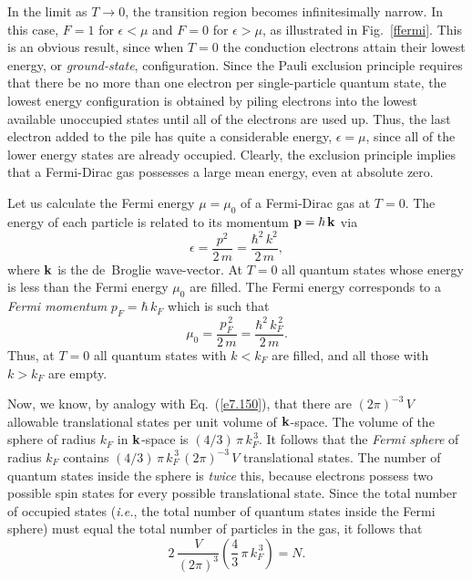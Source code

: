 In the limit as $T\rightarrow 0$, the transition region becomes
infinitesimally narrow. In this case, $F=1$ for $\epsilon<\mu$ and
$F=0$ for $\epsilon>\mu$, as illustrated in Fig.~\ref{ffermi}.
This is an obvious result, since when $T=0$ the conduction
electrons attain their lowest energy, or  {\em ground-state}, configuration.
Since the Pauli exclusion principle requires that there be no
more than one electron per single-particle quantum state, the lowest
energy configuration is obtained by piling
electrons into the lowest available unoccupied states until all of
the electrons are used up. Thus, the last electron added to the
pile has quite a considerable energy, $\epsilon= \mu$, since all of the
lower energy states are already occupied. Clearly, the exclusion principle
implies that a Fermi-Dirac gas possesses a large mean energy, even at absolute
zero.

Let us calculate the Fermi energy $\mu=\mu_0$ of a Fermi-Dirac
gas at $T=0$. The energy of each particle is related to its
momentum\/ ${\bf p} =\hbar\,{\bf k}$ via
\begin{equation}
\epsilon = \frac{p^2}{2\,m} =\frac{\hbar^2\,k^2}{2\,m},
\end{equation}
where ${\bf k}$ is the de~Broglie wave-vector. At $T=0$ all quantum states
whose energy is less than the Fermi energy $\mu_0$ are filled. The
Fermi energy corresponds to a {\em Fermi momentum}\/ $p_F=\hbar\,k_F$ which
is such that
\begin{equation}\label{e8fe}
\mu_0 = \frac{p_F^{\,2}}{2\,m} = \frac{\hbar^2\,k_F^{\,2}}{2\,m}.
\end{equation}
Thus, at $T=0$ all quantum states with $k<k_F$ are filled, and all
those with $k>k_F$ are empty.

Now, we know, by analogy with Eq.~(\ref{e7.150}), that there are $(2\pi)^{-3}\,V$
allowable translational states per unit volume of ${\bf k}$-space. The volume of
the sphere of radius $k_F$ in ${\bf k}$-space is $(4/3)\,\pi\,k_F^{\,3}$. It
follows that the {\em Fermi sphere}\/ of radius $k_F$ contains 
$(4/3)\,\pi\,k_F^{\,3}\,(2\pi)^{-3}\,V$ translational states. The number of
quantum states inside the sphere is {\em twice}\/ this, because electrons
possess two possible spin states for every possible translational state. Since the
total number of occupied states ({\em i.e.}, the total number of quantum
states inside the Fermi sphere) must equal the total number of particles
in the gas, it follows that
\begin{equation}
2\,\frac{V}{(2\pi)^3}\left(\frac{4}{3}\,\pi\,k_F^{\,3}\right) = N.
\end{equation}

